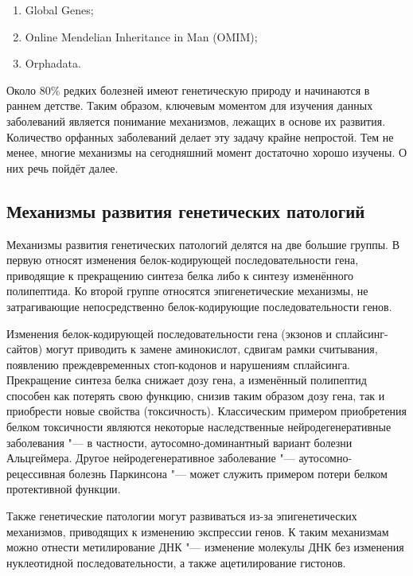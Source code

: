 \documentclass[a4paper,12pt]{article}
\begin{document}
\begin{enumerate}
\item Global Genes;
\item Online Mendelian Inheritance in Man (OMIM)\cite{Amberger_2014};
\item Orphadata.
\end{enumerate}

Около 80\% редких болезней имеют генетическую природу и начинаются в раннем детстве\cite{The_Lancet_Neurology_2011}.
Таким образом, ключевым моментом для изучения данных заболеваний является понимание механизмов, лежащих в основе их развития.
Количество орфанных заболеваний делает эту задачу крайне непростой.
Тем не менее, многие механизмы на сегодняшний момент достаточно хорошо изучены.
О них речь пойдёт далее.

\subsection{Механизмы развития генетических патологий}

Механизмы развития генетических патологий делятся на две большие группы.
В первую относят изменения белок-кодирующей последовательности гена, приводящие к прекращению синтеза белка либо к синтезу изменённого полипептида.
Ко второй группе относятся эпигенетические механизмы, не затрагивающие непосредственно белок-кодирующие последовательности генов.

Изменения белок-кодирующей последовательности гена (экзонов и сплайсинг-сайтов) могут приводить к замене аминокислот, сдвигам рамки считывания, появлению преждевременных стоп-кодонов и нарушениям сплайсинга.
Прекращение синтеза белка снижает дозу гена, а изменённый полипептид способен как потерять свою функцию, снизив таким образом дозу гена, так и приобрести новые свойства (токсичность).
Классическим примером приобретения белком токсичности являются некоторые наследственные нейродегенеративные заболевания "--- в частности, аутосомно-доминантный вариант болезни Альцгеймера.
Другое нейродегенеративное заболевание "--- аутосомно-рецессивная болезнь Паркинсона "--- может служить примером потери белком протективной функции\cite{Winklhofer_2008}.

Также генетические патологии могут развиваться из-за эпигенетических механизмов, приводящих к изменению экспрессии генов.
К таким механизмам можно отнести метилирование ДНК "--- изменение молекулы ДНК без изменения нуклеотидной последовательности, а также ацетилирование гистонов.
\end{document}
